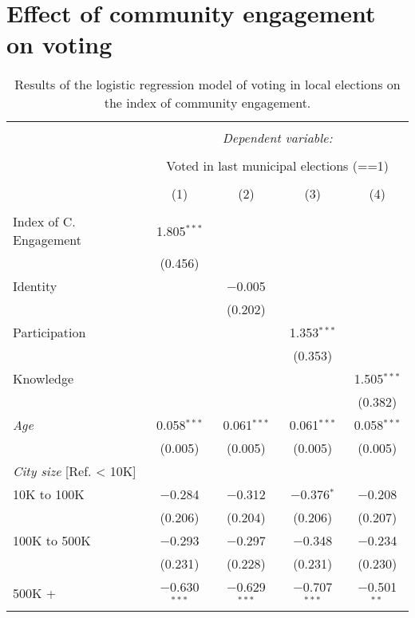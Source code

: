 \documentclass[12pt,a4paper]{article}
\begin{document}
\newpage
\section{Effect of community engagement on voting}
\begin{table}[!h] \centering 
\scriptsize
  \caption{Results of the logistic regression model of voting in local
   elections on the index of community engagement.} 
\label{tab:logistic_voting} 
\begin{tabular}{@{\extracolsep{5pt}}lcccc} 
\\[-1.8ex]\hline 
\hline \\[-1.8ex] 
 & \multicolumn{4}{c}{\textit{Dependent variable:}} \\ 
\cline{2-5} 
\\[-1.8ex] & \multicolumn{4}{c}{Voted in last municipal elections (==1)} \\ 
\\[-1.8ex] & (1) & (2) & (3) & (4)\\ 
\hline \\[-1.8ex] 
Index of C. Engagement & 1.805$^{***}$ &  &  &  \\ 
  & (0.456) &  &  &  \\ 
Identity &  & $-$0.005 &  &  \\ 
  &  & (0.202) &  &  \\ 
Participation &  &  & 1.353$^{***}$ &  \\ 
  &  &  & (0.353) &  \\ 
Knowledge &  &  &  & 1.505$^{***}$ \\ 
  &  &  &  & (0.382) \\ 
{\it Age} & 0.058$^{***}$ & 0.061$^{***}$ & 0.061$^{***}$ & 0.058$^{***}$ \\ 
  & (0.005) & (0.005) & (0.005) & (0.005) \\ 
{\it City size} [Ref. < 10K]\\
10K to 100K & $-$0.284 & $-$0.312 & $-$0.376$^{*}$ & $-$0.208 \\ 
  & (0.206) & (0.204) & (0.206) & (0.207) \\ 
100K to 500K & $-$0.293 & $-$0.297 & $-$0.348 & $-$0.234 \\ 
  & (0.231) & (0.228) & (0.231) & (0.230) \\ 
500K + & $-$0.630$^{***}$ & $-$0.629$^{***}$ & $-$0.707$^{***}$ & $-$0.501$^{**}$ \\ 

\end{tabular}
\end{table}
\end{document}
